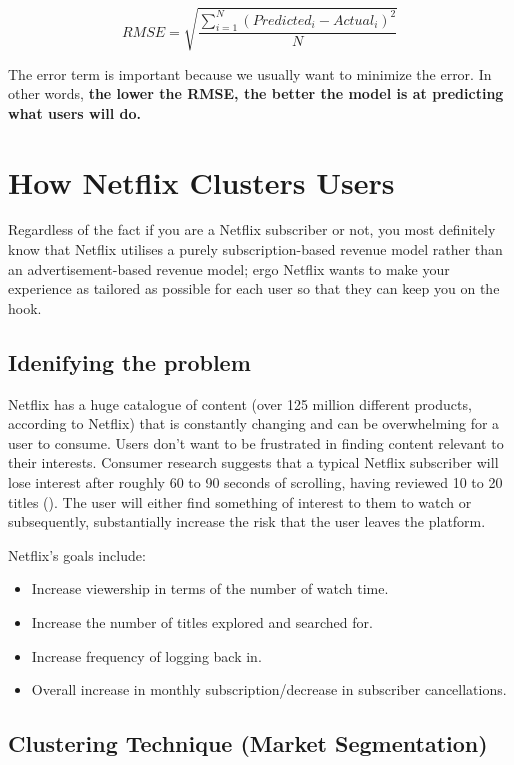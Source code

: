 \documentclass[12pt,a4paper]{article}
\begin{document}
\begin{equation}
	RMSE = \sqrt{\frac{\sum\limits_{i=1}^{N}{(Predicted_i - Actual_i)^2}}{N}}
\end{equation}

The error term is important because we usually want to minimize the error. In other words, \textbf{the lower the RMSE, the better the model is at predicting what users will do.}

\section{How Netflix Clusters Users}
Regardless of the fact if you are a Netflix subscriber or not, you most definitely know that Netflix utilises a purely subscription-based revenue model rather than an advertisement-based revenue model; ergo Netflix wants to make your experience as tailored as possible for each user so that they can keep you on the hook.

\subsection{Idenifying the problem}
Netflix has a huge catalogue of content (over 125 million different products, according to Netflix) that is constantly changing and can be overwhelming for a user to consume. Users don’t want to be frustrated in finding content relevant to their interests. Consumer research suggests that a typical Netflix subscriber will lose interest after roughly 60 to 90 seconds of scrolling, having reviewed 10 to 20 titles (\cite{gomez2016netflix}). The user will either find something of interest to them to watch or subsequently, substantially increase the risk that the user leaves the platform.

\medskip Netflix's goals include:
\begin{itemize}
	\item Increase viewership in terms of the number of watch time.
	\item Increase the number of titles explored and searched for.
	\item Increase frequency of logging back in.
	\item Overall increase in monthly subscription/decrease in subscriber cancellations.
\end{itemize}

\subsection{Clustering Technique (Market Segmentation)}
\end{document}
